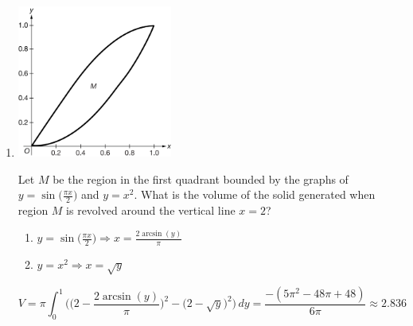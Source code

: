 \documentclass[12pt]{article}
\begin{document}
\begin{enumerate}
    \item 
    \begin{center}
        \includegraphics[width=2in]{4.033.png}
    \end{center}
    Let $M$ be the region in the first quadrant bounded by the graphs of $y=\sin\big(\frac{\pi x}{2}\big)$ and $y=x^2$. What is the volume of the solid generated when region $M$ is revolved around the vertical line $x=2$?
    \begin{enumerate}
        \item $y=\sin\big(\frac{\pi x}{2}\big) \Longrightarrow x=\frac{2\arcsin(y)}{\pi}$
        \item $y=x^2 \Longrightarrow x=\sqrt{y}$
    \end{enumerate}
    $$V=\pi\int_{0}^{1} \Biggr(\biggr(2-\frac{2\arcsin(y)}{\pi}\biggr)^2-\big(2-\sqrt{y}\big)^2 \Biggr) \, dy = \frac{-(5\pi^2-48\pi+48)}{6\pi}\approx \boxed{2.836}$$


\end{enumerate}
\end{document}
